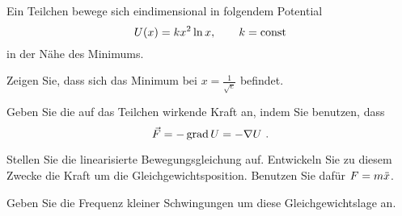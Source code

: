\begin{atiTask}[
  title = Linearisierte Schwingungen
]
  Ein Teilchen bewege sich eindimensional in folgendem Potential
  \[
    U(x) = kx^2\ln x,\qquad k = \mathrm{const}
  \]
  in der Nähe des Minimums.
  \begin{atiSubtasks}
    \item{
      Zeigen Sie, dass sich das Minimum bei $x=\frac{1}{\sqrt{e}}$ befindet.
    }
    \item{
      Geben Sie die auf das Teilchen wirkende Kraft an, indem Sie benutzen, dass
      \[
        \vec{F} = -\operatorname{grad} U = -\nabla U \ .
      \]
    }
    \item{
      Stellen Sie die linearisierte Bewegungsgleichung auf.
      Entwickeln Sie zu diesem Zwecke die Kraft um die Gleichgewichtsposition.
      Benutzen Sie dafür $F = m\ddot{x}$.
    }
    \item{
      Geben Sie die Frequenz kleiner Schwingungen um diese Gleichgewichtslage an.
    }
  \end{atiSubtasks}
\end{atiTask}